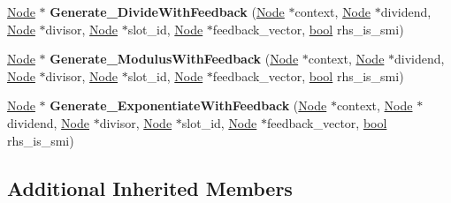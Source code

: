 \begin{DoxyCompactItemize}
\item 
\mbox{\label{classv8_1_1internal_1_1BinaryOpAssembler_aee9fe3f6a033afee49cf5e676bf2823a}} 
\mbox{\hyperlink{classv8_1_1internal_1_1compiler_1_1Node}{Node}} $\ast$ {\bfseries Generate\+\_\+\+Divide\+With\+Feedback} (\mbox{\hyperlink{classv8_1_1internal_1_1compiler_1_1Node}{Node}} $\ast$context, \mbox{\hyperlink{classv8_1_1internal_1_1compiler_1_1Node}{Node}} $\ast$dividend, \mbox{\hyperlink{classv8_1_1internal_1_1compiler_1_1Node}{Node}} $\ast$divisor, \mbox{\hyperlink{classv8_1_1internal_1_1compiler_1_1Node}{Node}} $\ast$slot\+\_\+id, \mbox{\hyperlink{classv8_1_1internal_1_1compiler_1_1Node}{Node}} $\ast$feedback\+\_\+vector, \mbox{\hyperlink{classbool}{bool}} rhs\+\_\+is\+\_\+smi)
\item 
\mbox{\label{classv8_1_1internal_1_1BinaryOpAssembler_a07546bfb544ec3ced912225185bebd6a}} 
\mbox{\hyperlink{classv8_1_1internal_1_1compiler_1_1Node}{Node}} $\ast$ {\bfseries Generate\+\_\+\+Modulus\+With\+Feedback} (\mbox{\hyperlink{classv8_1_1internal_1_1compiler_1_1Node}{Node}} $\ast$context, \mbox{\hyperlink{classv8_1_1internal_1_1compiler_1_1Node}{Node}} $\ast$dividend, \mbox{\hyperlink{classv8_1_1internal_1_1compiler_1_1Node}{Node}} $\ast$divisor, \mbox{\hyperlink{classv8_1_1internal_1_1compiler_1_1Node}{Node}} $\ast$slot\+\_\+id, \mbox{\hyperlink{classv8_1_1internal_1_1compiler_1_1Node}{Node}} $\ast$feedback\+\_\+vector, \mbox{\hyperlink{classbool}{bool}} rhs\+\_\+is\+\_\+smi)
\item 
\mbox{\label{classv8_1_1internal_1_1BinaryOpAssembler_a9a01e203a4298388f4a27781c06bd93b}} 
\mbox{\hyperlink{classv8_1_1internal_1_1compiler_1_1Node}{Node}} $\ast$ {\bfseries Generate\+\_\+\+Exponentiate\+With\+Feedback} (\mbox{\hyperlink{classv8_1_1internal_1_1compiler_1_1Node}{Node}} $\ast$context, \mbox{\hyperlink{classv8_1_1internal_1_1compiler_1_1Node}{Node}} $\ast$dividend, \mbox{\hyperlink{classv8_1_1internal_1_1compiler_1_1Node}{Node}} $\ast$divisor, \mbox{\hyperlink{classv8_1_1internal_1_1compiler_1_1Node}{Node}} $\ast$slot\+\_\+id, \mbox{\hyperlink{classv8_1_1internal_1_1compiler_1_1Node}{Node}} $\ast$feedback\+\_\+vector, \mbox{\hyperlink{classbool}{bool}} rhs\+\_\+is\+\_\+smi)
\end{DoxyCompactItemize}
\subsection*{Additional Inherited Members}



